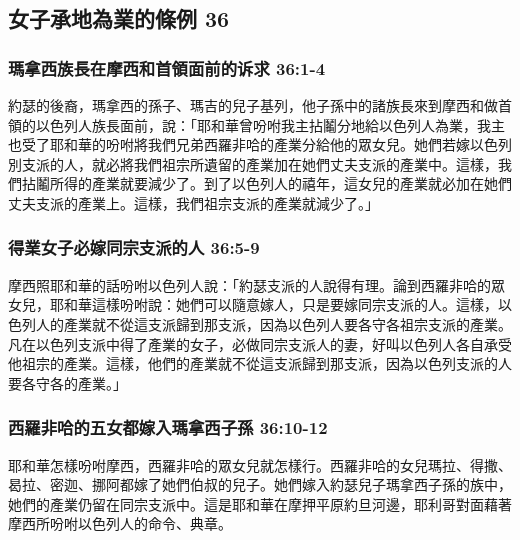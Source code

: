  	
\subsection{女子承地為業的條例 36 }
\subsubsection{瑪拿西族長在摩西和首領面前的诉求 36:1-4}
約瑟的後裔，瑪拿西的孫子、瑪吉的兒子基列，他子孫中的諸族長來到摩西和做首領的以色列人族長面前，說：「耶和華曾吩咐我主拈鬮分地給以色列人為業，我主也受了耶和華的吩咐將我們兄弟西羅非哈的產業分給他的眾女兒。她們若嫁以色列別支派的人，就必將我們祖宗所遺留的產業加在她們丈夫支派的產業中。這樣，我們拈鬮所得的產業就要減少了。到了以色列人的禧年，這女兒的產業就必加在她們丈夫支派的產業上。這樣，我們祖宗支派的產業就減少了。」
 
\subsubsection{得業女子必嫁同宗支派的人 36:5-9}
摩西照耶和華的話吩咐以色列人說：「約瑟支派的人說得有理。論到西羅非哈的眾女兒，耶和華這樣吩咐說：她們可以隨意嫁人，只是要嫁同宗支派的人。這樣，以色列人的產業就不從這支派歸到那支派，因為以色列人要各守各祖宗支派的產業。凡在以色列支派中得了產業的女子，必做同宗支派人的妻，好叫以色列人各自承受他祖宗的產業。這樣，他們的產業就不從這支派歸到那支派，因為以色列支派的人要各守各的產業。」

\subsubsection{西羅非哈的五女都嫁入瑪拿西子孫 36:10-12}
耶和華怎樣吩咐摩西，西羅非哈的眾女兒就怎樣行。西羅非哈的女兒瑪拉、得撒、曷拉、密迦、挪阿都嫁了她們伯叔的兒子。她們嫁入約瑟兒子瑪拿西子孫的族中，她們的產業仍留在同宗支派中。這是耶和華在摩押平原約旦河邊，耶利哥對面藉著摩西所吩咐以色列人的命令、典章。


